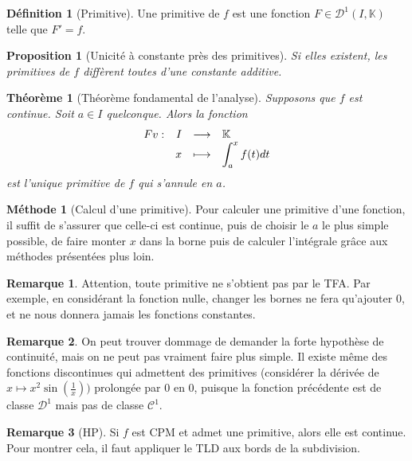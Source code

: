\documentclass[french]{book}
\newcommand{\K}{\mathbb{K}}
\theoremstyle{plain}
\newtheorem{thm}{Théorème}[chapter]
\newtheorem{prop}{Proposition}[chapter]
\theoremstyle{definition}
\newtheorem{dfn}{Définition}[chapter]
\newtheorem{rmq}{Remarque}[chapter]
\newtheorem{met}{Méthode}[chapter]
\theoremstyle{remark}
\begin{document}
\begin{dfn}[Primitive]
	Une primitive de $f$ est une fonction $F\in\mathcal{D}^1(I,\K)$ telle que $F'=f$.
\end{dfn}
\begin{prop}[Unicité à constante près des primitives]
	Si elles existent, les primitives de $f$ diffèrent toutes d'une constante additive.
\end{prop}
\begin{thm}[Théorème fondamental de l'analyse]
	Supposons que $f$ est continue. Soit $a\in I$ quelconque. Alors la fonction
	$$
	\begin{array}[t]{lrcl}
		Fv: & I & \longrightarrow & \K \\
		& x & \longmapsto & \displaystyle \int_{a}^{x}f(t)dt
	\end{array}
	$$ est l'unique primitive de $f$ qui s'annule en $a$.
\end{thm}
\begin{met}[Calcul d'une primitive] Pour calculer une primitive d'une fonction, il suffit de s'assurer que celle-ci est continue, puis de choisir le $a$ le plus simple possible, de faire monter $x$ dans la borne puis de calculer l'intégrale grâce aux méthodes présentées plus loin. \end{met}
\begin{rmq} Attention, toute primitive ne s'obtient pas par le TFA. Par exemple, en considérant la fonction nulle, changer les bornes ne fera qu'ajouter 0, et ne nous donnera jamais les fonctions constantes. \end{rmq}
\begin{rmq} On peut trouver dommage de demander la forte hypothèse de continuité, mais on ne peut pas vraiment faire plus simple. Il existe même des fonctions discontinues qui admettent des primitives (considérer la dérivée de $x\mapsto x^2\sin(\frac1x))$ prolongée par 0 en 0, puisque la fonction précédente est de classe $\mathcal{D}^1$ mais pas de classe $\mathcal{C}^1$. \end{rmq}
\begin{rmq}[HP] Si $f$ est CPM et admet une primitive, alors elle est continue. Pour montrer cela, il faut appliquer le TLD aux bords de la subdivision. \end{rmq}
\end{document}
